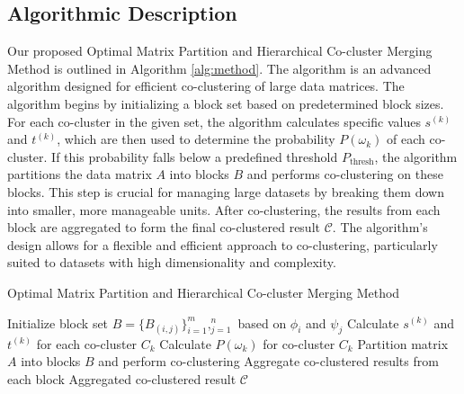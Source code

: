 \subsection{Algorithmic Description}
Our proposed  Optimal Matrix Partition and Hierarchical Co-cluster Merging Method is outlined in Algorithm \ref{alg:method}. The algorithm
is an advanced algorithm designed for efficient co-clustering of large data matrices. The algorithm begins by initializing a block set based on predetermined block sizes. For each co-cluster in the given set, the algorithm calculates specific values $s^{(k)}$ and $t^{(k)}$, which are then used to determine the probability $P(\omega_k)$ of each co-cluster. If this probability falls below a predefined threshold $P_{\text{thresh}}$, the algorithm partitions the data matrix $A$ into blocks $B$ and performs co-clustering on these blocks. This step is crucial for managing large datasets by breaking them down into smaller, more manageable units. After co-clustering, the results from each block are aggregated to form the final co-clustered result $\mathcal{C}$. The algorithm's design allows for a flexible and efficient approach to co-clustering, particularly suited to datasets with high dimensionality and complexity.

\begin{algorithm}[!t]
    \caption{Optimal Matrix Partition and Hierarchical Co-cluster Merging Method}\label{alg:method}
    \begin{algorithmic}[1]
        \STATE Initialize block set $B = \{B_{(i,j)}\}_{i=1}^m,_{j=1}^n$ based on $\phi_i$ and $\psi_j$
        \STATE Calculate $s^{(k)}$ and $t^{(k)}$ for each co-cluster $C_k$
        \STATE Calculate $P(\omega_k)$ for co-cluster $C_k$
        \STATE Partition matrix $A$ into blocks $B$ and perform co-clustering
        \STATE Aggregate co-clustered results from each block
        \ENDIF
        \ENDFOR
        \RETURN Aggregated co-clustered result $\mathcal{C}$
    \end{algorithmic}
\end{algorithm}
